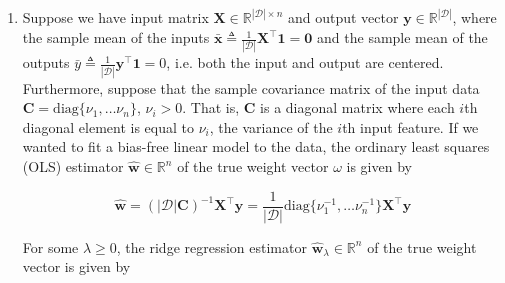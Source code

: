 \documentclass{article}
\numberwithin{equation}{section}
\begin{document}
\begin{enumerate}
    \item
    Suppose we have input matrix $ \mathbf{X} \in
    \mathbb{R}^{|\mathcal{D}| \times n} $ and output vector $ \mathbf{y} \in
    \mathbb{R}^{|\mathcal{D}|} $, where the sample mean of the inputs
    $ \bar{\mathbf{x}} \triangleq
    \frac{1}{|\mathcal{D}|}\mathbf{X}^\top\mathbf{1} = \mathbf{0} $ and the
    sample mean of the outputs $ \bar{y} \triangleq \frac{1}{|\mathcal{D}|}
    \mathbf{y}^\top\mathbf{1} = 0 $, i.e. both the input and output are
    centered. Furthermore, suppose that the sample covariance matrix of the
    input data $ \mathbf{C} = \mathrm{diag}\{\nu_1, \ldots \nu_n\} $,
    $ \nu_i > 0 $. That is, $ \mathbf{C} $ is a diagonal matrix where each
    $ i $th diagonal element is equal to $ \nu_i $, the variance of the $ i $th
    input feature. If we wanted to fit a bias-free\footnotemark{} linear model to the data, the ordinary least squares (OLS) estimator
    $ \hat{\mathbf{w}} \in \mathbb{R}^n $ of the true weight vector $ \omega $
    is given by

    \begin{equation*}
        \hat{\mathbf{w}} =
        (|\mathcal{D}|\mathbf{C})^{-1}\mathbf{X}^\top\mathbf{y} =
        \frac{1}{|\mathcal{D}|}\mathrm{diag}\{\nu_1^{-1}, \ldots \nu_n^{-1}\}
        \mathbf{X}^\top\mathbf{y}
    \end{equation*}

    For some $ \lambda \ge 0 $, the ridge regression estimator
    $ \hat{\mathbf{w}}_\lambda \in \mathbb{R}^n $ of the true weight vector is
    given by


\end{enumerate}
\end{document}
